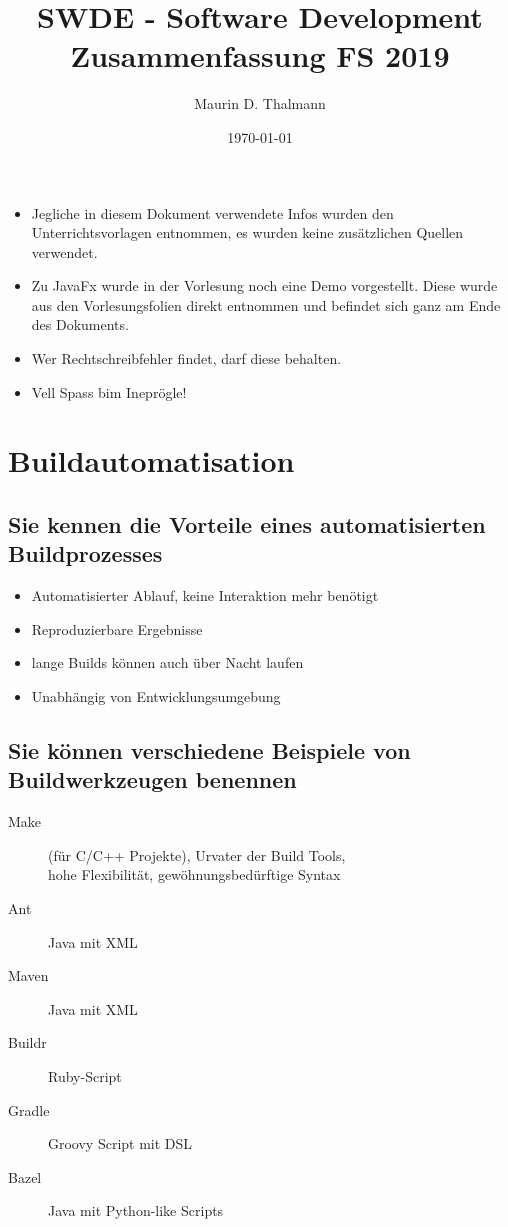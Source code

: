 \documentclass[a4paper]{article}
\title{\textbf{SWDE - Software Development\\
Zusammenfassung FS 2019}}
\date{\today}
\author{Maurin D. Thalmann}
\begin{document}
	\maketitle
	
	\begin{itemize}
		\item Jegliche in diesem Dokument verwendete Infos wurden den Unterrichtsvorlagen entnommen, es wurden keine zusätzlichen Quellen verwendet.
		\item Zu JavaFx wurde in der Vorlesung noch eine Demo vorgestellt.
		Diese wurde aus den Vorlesungsfolien direkt entnommen und befindet sich ganz am Ende des Dokuments.
		\item Wer Rechtschreibfehler findet, darf diese behalten.
		\item Vell Spass bim Ineprögle!
	\end{itemize}
	
	\newpage
	\tableofcontents
	\newpage
	
	\section{Buildautomatisation}
	
		\subsection{Sie kennen die Vorteile eines automatisierten Buildprozesses}
			\begin{itemize}
				\item Automatisierter Ablauf, keine Interaktion mehr benötigt
				\item Reproduzierbare Ergebnisse
				\item lange Builds können auch über Nacht laufen
				\item Unabhängig von Entwicklungsumgebung
			\end{itemize}
		
		\subsection{Sie können verschiedene Beispiele von Buildwerkzeugen benennen}
			\begin{description}
				\item[Make] (für C/C++ Projekte), Urvater der Build Tools, \\
				hohe Flexibilität, gewöhnungsbedürftige Syntax
				\item[Ant] Java mit XML
				\item[Maven] Java mit XML
				\item[Buildr] Ruby-Script
				\item[Gradle] Groovy Script mit DSL
				\item[Bazel] Java mit Python-like Scripts
			\end{description}
		
\end{document}
